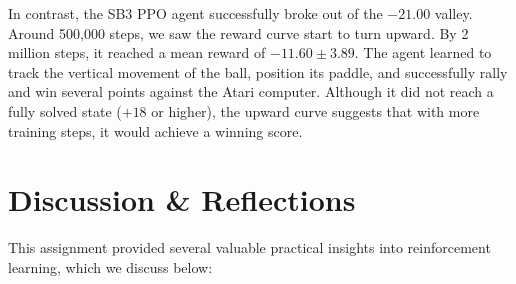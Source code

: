 \documentclass[12pt]{article}
\begin{document}
In contrast, the SB3 PPO agent successfully broke out of the $-21.00$ valley. Around 500,000 steps, we saw the reward curve start to turn upward. By 2 million steps, it reached a mean reward of $-11.60 \pm 3.89$. The agent learned to track the vertical movement of the ball, position its paddle, and successfully rally and win several points against the Atari computer. Although it did not reach a fully solved state ($+18$ or higher), the upward curve suggests that with more training steps, it would achieve a winning score.

\section{Discussion \& Reflections}
\label{sec:discussion}

This assignment provided several valuable practical insights into reinforcement learning, which we discuss below:
\end{document}
